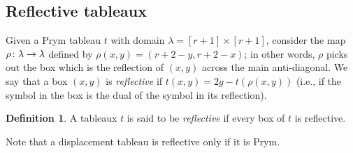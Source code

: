 \documentclass[11pt,reqno]{amsart}
\newcommand*{\maps}{\nobreak\mskip2mu\mathpunct{}\nonscript
  \mkern-\thinmuskip{:}\mskip6muplus1mu\relax}
\newcommand*{\wti}[1]{\widetilde{#1}}
\newcommand{\caelan}[1]{\textcolor{orange}{\sf C: [#1]}}
\DeclareMathOperator{\Pic}{Pic}
\DeclareMathOperator{\Prym}{Prym}
\theoremstyle{definition}
\newtheorem{definition}{Definition}[section]
\theoremstyle{problem}
\theoremstyle{plain}
\theoremstyle{remark}
\theoremstyle{theorem}
\numberwithin{equation}{section}
\numberwithin{figure}{section}
\theoremstyle{definition}
\newtheorem{definition}{Definition}[section]
\theoremstyle{problem}
\theoremstyle{plain}
\begin{document}



\subsection{Reflective tableaux}\label{sec:reflective}

Given a Prym tableau $t$ with domain
$\lambda = [r+1]\times[r+1]$, consider the map
$\rho\maps\lambda\to\lambda$ defined by $\rho(x,y)=(r+2-y, r+2-x)$; in
other words, $\rho$ picks out the box which is the reflection of
$(x,y)$ across the main anti-diagonal.  We say that a box $(x,y)$ is
\textit{reflective} if $t(x,y) = 2g - t(\rho(x,y))$ (i.e., if the
symbol in the box is the dual of the symbol in its reflection).

\begin{definition}
  A tableaux $t$ is said to be \textit{reflective} if 
  every box of $t$
  is reflective.
\end{definition}
\noindent Note that a displacement tableau is reflective only if it is Prym.
\end{document}
